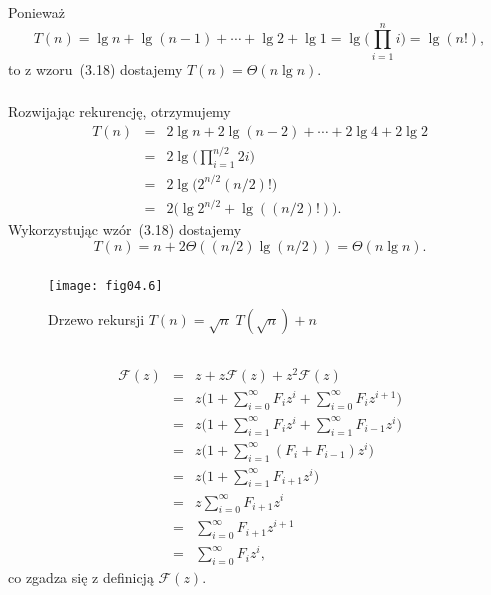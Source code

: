 \subsubsection{} %
Ponieważ
\[
	T(n) = \lg n+\lg(n-1)+\cdots+\lg2+\lg 1 = \lg\biggl(\prod_{i=1}^ni\biggr) = \lg(n!),
\]
to z wzoru~(3.18) dostajemy $T(n)=\Theta(n\lg n)$.

\subsubsection{} %
Rozwijając rekurencję, otrzymujemy
\begin{eqnarray*}
	T(n) &=& 2\lg n+2\lg(n-2)+\cdots+2\lg4+2\lg2 \\
	&=& 2\lg\biggl(\prod_{i=1}^{n/2}2i\biggr) \\
	&=& 2\lg\bigl(2^{n/2}(n/2)!\bigr) \\
	&=& 2\bigl(\lg 2^{n/2}+\lg((n/2)!)\bigr).
\end{eqnarray*}
Wykorzystując wzór~(3.18) dostajemy
\[
	T(n) = n+2\Theta((n/2)\lg (n/2)) = \Theta(n\lg n).
\]

\subsubsection{} %
\begin{figure}[h]
	\begin{center}
		\texttt{[image: fig04.6]}
	\caption{Drzewo rekursji $T(n)=\sqrt{n}\;T(\!\sqrt{n})+n$} \label{fig:4-4j}
	\end{center}
\end{figure}

\subsection{} %

\subsubsection{} %
\begin{eqnarray*}
	\mathcal{F}(z) &=& z+z\mathcal{F}(z)+z^2\mathcal{F}(z) \\
	&=& z\biggl(1+\sum_{i=0}^\infty F_iz^i+\sum_{i=0}^\infty F_iz^{i+1}\biggr) \\
	&=& z\biggl(1+\sum_{i=1}^\infty F_iz^i+\sum_{i=1}^\infty F_{i-1}z^i\biggr) \\
	&=& z\biggl(1+\sum_{i=1}^\infty (F_i+F_{i-1})z^i\biggr) \\
	&=& z\biggl(1+\sum_{i=1}^\infty F_{i+1}z^i\biggr) \\
	&=& z\sum_{i=0}^\infty F_{i+1}z^i \\
	&=& \sum_{i=0}^\infty F_{i+1}z^{i+1} \\
	&=& \sum_{i=0}^\infty F_iz^i,
\end{eqnarray*}
co zgadza się z definicją $\mathcal{F}(z)$.

